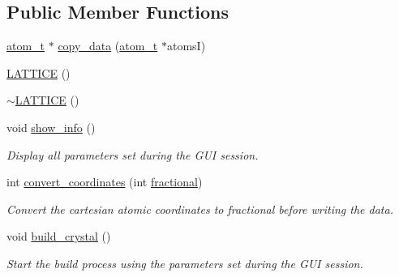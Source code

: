 \subsection*{Public Member Functions}
\begin{DoxyCompactItemize}
\item 
\hyperlink{structatom__t}{atom\+\_\+t} $\ast$ \hyperlink{class_l_a_t_t_i_c_e_a3a2222333e6da3cb42954bc1c66f9c44}{copy\+\_\+data} (\hyperlink{structatom__t}{atom\+\_\+t} $\ast$atoms\+I)
\item 
\hyperlink{class_l_a_t_t_i_c_e_aabfd2a1302dd09ab010cf26414175436}{L\+A\+T\+T\+I\+C\+E} ()
\item 
\hyperlink{class_l_a_t_t_i_c_e_a2e6f18c8b01ca4bbed6132603ade137e}{$\sim$\+L\+A\+T\+T\+I\+C\+E} ()
\item 
void \hyperlink{class_l_a_t_t_i_c_e_a9dd17973a1e8c445663553864f82bea6}{show\+\_\+info} ()
\begin{DoxyCompactList}\small\item\em Display all parameters set during the G\+U\+I session. \end{DoxyCompactList}\item 
int \hyperlink{class_l_a_t_t_i_c_e_aba8ae41405acc746ae6294dd0ad67f96}{convert\+\_\+coordinates} (int \hyperlink{class_l_a_t_t_i_c_e_a922caeabeb80ebdc3c899b64eaf527ac}{fractional})
\begin{DoxyCompactList}\small\item\em Convert the cartesian atomic coordinates to fractional before writing the data. \end{DoxyCompactList}\item 
void \hyperlink{class_l_a_t_t_i_c_e_a764395141f8545e8b2dc237371c177ad}{build\+\_\+crystal} ()
\begin{DoxyCompactList}\small\item\em Start the build process using the parameters set during the G\+U\+I session. \end{DoxyCompactList}\end{DoxyCompactItemize}
